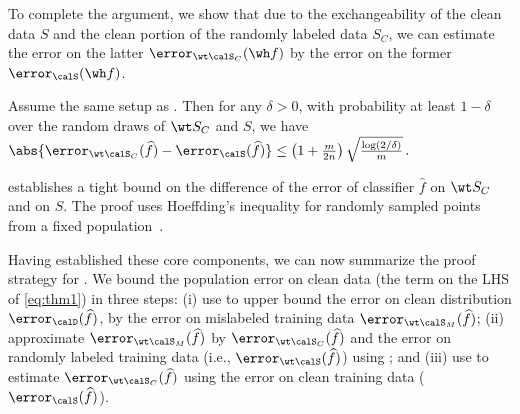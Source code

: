 To complete the argument, 
we show that due to the exchangeability of the clean data $S$
and the clean portion of the randomly labeled data $S_C$,
we can estimate the error on the latter $\error_{\wt \calS_C} (\wh f)$
by the error on the former $\error_{\calS} (\wh f)$.
% 

\begin{lemma} \label{lem:clear_error}
    Assume the same setup as . 
    Then for any $\delta >0$, with probability at least $1-\delta$ 
    over the random draws of $\wt S_C$ and $S$, we have 
        $\abs{\error_{\wt \calS_C}(\widehat f) - \error_{\calS}(\widehat f) } \le \left(1 + \frac{m}{2n}\right) \sqrt{\frac{\log(2/\delta)}{m}}\,.$ %
\end{lemma} 

 establishes a tight bound 
on the difference of the error 
of classifier $\widehat f$
on $\wt S_C$ and on $S$. 
The proof uses Hoeffding's inequality for randomly sampled points from a fixed population~\citep{hoeffding1994probability,bardenet2015concentration}.  

Having established these core components,
we can now summarize
the proof strategy for . 
We bound the population error on clean data  
(the term on the LHS of \eqref{eq:thm1}) in three steps: 
(i) use  to upper bound 
the error on clean distribution $\error_\calD(\widehat f)$, 
by the error on mislabeled training data $\error_{\wt \calS_M}(\widehat f)$; 
(ii) approximate $\error_{\wt \calS_M}(\widehat f)$ 
by $\error_{\wt \calS_C}(\widehat f)$ 
and the error on randomly labeled training data 
(i.e.,  $\error_{\wt \calS}(\widehat f)$) using ; 
and (iii) use  
to estimate $\error_{\wt \calS_C}(\widehat f)$ 
using the error on clean training data 
($\error_{\calS}(\widehat f)$).
% 
%   
% 

